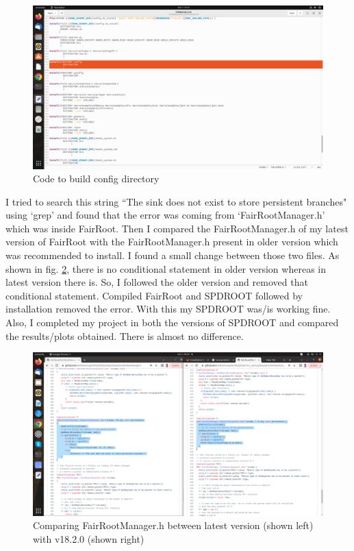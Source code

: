\documentclass[12pt]{article}
\begin{document}
\begin{figure}[h]
\centering
\includegraphics[scale=0.18]{ss5.png}
\caption{Code to build config directory}
\label{Code to build config directory}
\end{figure}

I tried to search this string ``The sink does not exist to store persistent branches" using `grep' and found that the error was coming from `FairRootManager.h' which was inside FairRoot. Then I compared the FairRootManager.h of my latest version of FairRoot with the FairRootManager.h present in older version which was recommended to install. I found a small change between those two files. As shown in fig. \ref{Comparing FairRootManager.h between latest version (shown left) with v18.2.0 (shown right)}, there is no conditional statement in older version whereas in latest version there is. So, I followed the older version and removed that conditional statement. Compiled FairRoot and SPDROOT followed by installation removed the error. With this my SPDROOT was/is working fine. Also, I completed my project in both the versions of SPDROOT and compared the results/plots obtained. There is almost no difference.\\

\begin{figure}[h]
\centering
\includegraphics[scale=0.18]{ss3.png}
\caption{Comparing FairRootManager.h between latest version (shown left) with v18.2.0 (shown right)}
\label{Comparing FairRootManager.h between latest version (shown left) with v18.2.0 (shown right)}
\end{figure}
\end{document}
